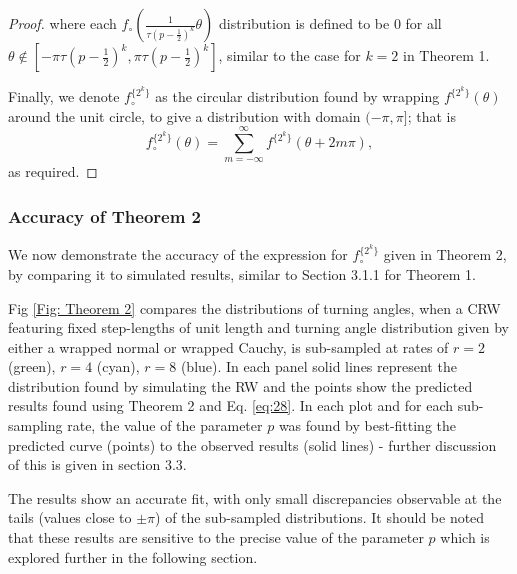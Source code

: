 \documentclass[english]{article}
\begin{document}
\begin{proof}
where each $f_\circ\left(\frac{1}{\tau(p-\frac{1}{2})^k}\theta\right)$ distribution is defined to be $0$ for all $\theta\notin [-\pi\tau(p-\frac{1}{2})^k,\pi\tau(p-\frac{1}{2})^k]$, similar to the case for $k=2$ in Theorem 1.

Finally, we denote $f^{\{2^k\}}_{\circ}$ as the circular distribution found by wrapping $f^{\{2^{k}\}}(\theta)$ around the unit circle, to give a distribution with domain $(-\pi,\pi]$; that is 
\begin{equation}
    f^{\{2^k\}}_{\circ}(\theta)=\sum_{m=-\infty}^{\infty}f^{\{2^{k}\}}(\theta+2m\pi),
\end{equation} 
as required.
\end{proof}

\subsubsection{Accuracy of Theorem 2}
We now demonstrate the accuracy of the expression for $f_{\circ}^{\{2^{k}\}}$ given in Theorem 2, by comparing it to simulated results, similar to Section 3.1.1 for Theorem 1.

Fig \ref{Fig: Theorem 2} compares the distributions of turning angles, when 
a CRW featuring fixed step-lengths of unit length and turning angle distribution given by either a wrapped normal or wrapped Cauchy, is sub-sampled at rates of $r=2$ (green), $r=4$ (cyan), $r=8$ (blue).  In each panel solid lines represent the distribution found by simulating the RW and the points show the predicted results found using Theorem 2 and Eq. \ref{eq:28}.  In each plot and for each sub-sampling rate, the value of the parameter $p$ was found by best-fitting the predicted curve (points) to the observed results (solid lines) - further discussion of this is given in section 3.3.

The results show an accurate fit, with only small discrepancies observable at the tails (values close to $\pm\pi$) of the sub-sampled distributions.  It should be noted that these results are sensitive to the precise value of the parameter $p$ which is explored further in the following section.
\end{document}
